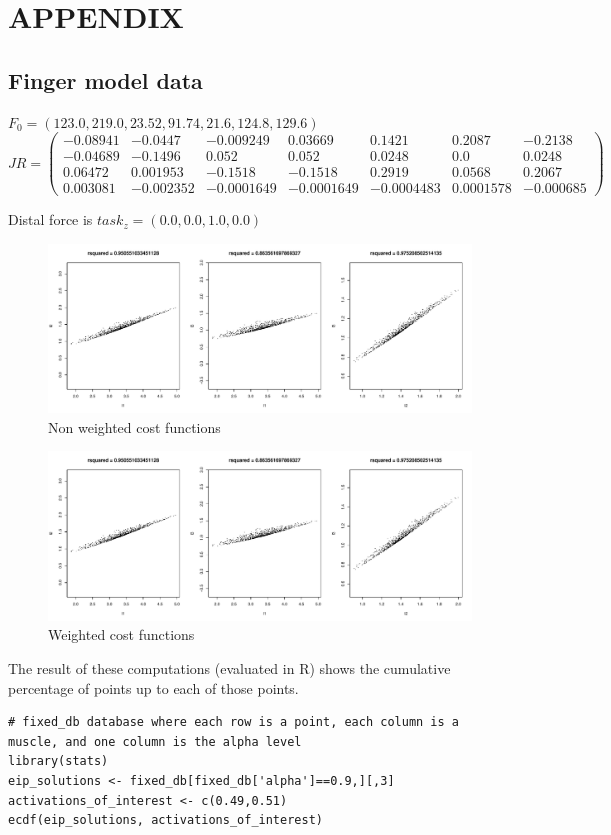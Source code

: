 \section{APPENDIX}

\subsection{Finger model data}
$F_0 = (123.0, 219.0, 23.52, 91.74,	21.6, 124.8, 129.6)$\\
$
JR = 
\begin{pmatrix}
-0.08941 & -0.0447 & -0.009249 & 0.03669 & 0.1421 & 0.2087 & -0.2138 \\
-0.04689 & -0.1496 & 0.052 &0.052 & 0.0248 & 0.0 & 0.0248 \\ 
0.06472 & 0.001953 & -0.1518 &-0.1518 & 0.2919 & 0.0568 & 0.2067 \\
0.003081 & -0.002352 & -0.0001649 & -0.0001649 & -0.0004483 & 0.0001578 & -0.000685
\end{pmatrix}$

Distal force is $task_z = (0.0,0.0,1.0,0.0)$

\begin{figure}[h]
\centering
\includegraphics[width=\textwidth,page=1]{figs/cost_function_scatterplots.pdf}
\caption{Non weighted cost functions}
\label{fig:unweighted_cost_functions}
\end{figure}

\begin{figure}[h]
\centering
\includegraphics[width=\textwidth,page=2]{figs/cost_function_scatterplots.pdf}
\caption{Weighted cost functions}
\label{fig:weighted_cost_functions}
\end{figure}
The result of these computations (evaluated in R) shows the cumulative percentage of points up to each of those points.
\begin{verbatim}
# fixed_db database where each row is a point, each column is a muscle, and one column is the alpha level
library(stats)
eip_solutions <- fixed_db[fixed_db['alpha']==0.9,][,3]
activations_of_interest <- c(0.49,0.51)
ecdf(eip_solutions, activations_of_interest)
\end{verbatim}

